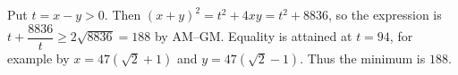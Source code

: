 Put $t=x-y>0$. Then $(x+y)^2=t^2+4xy=t^2+8836$, so the expression is $t+\dfrac{8836}{t}\ge2\sqrt{8836}=188$ by AM--GM. Equality is attained at $t=94$, for example by $x=47(\sqrt2+1)$ and $y=47(\sqrt2-1)$. Thus the minimum is $\boxed{188}$.
